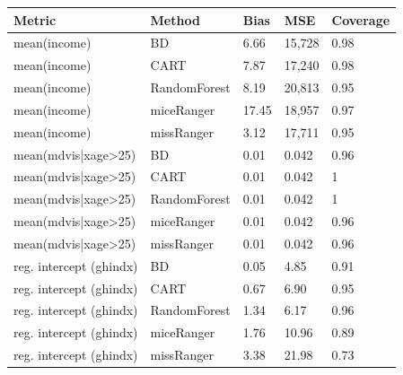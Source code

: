 \documentclass[20pt,margin=1in,innermargin=-4.5in,blockverticalspace=-0.25in]{tikzposter}
\begin{document}
\begin{columns}
{        \begin{center}
        \vspace{-0.5em}
        \begin{tabular}{|l|l|lll|}
             \hline   
             Metric &  Method & Bias \hspace{10mm} & MSE \hspace{5mm} & Coverage\\
             \hline
             mean(income) & BD & 6.66  & 15,728 & 0.98\\
             mean(income) & CART & 7.87 & 17,240 & 0.98\\
             mean(income) & RandomForest & 8.19 & 20,813 & 0.95\\
             mean(income) & miceRanger & 17.45 & 18,957 & 0.97\\
             mean(income) & missRanger  & 3.12 & 17,711 & 0.95 \\
             \hline
             mean(mdvis|xage>25) & BD & 0.01 & 0.042 & 0.96\\
             mean(mdvis|xage>25) & CART & 0.01 & 0.042 & 1\\
             mean(mdvis|xage>25) & RandomForest & 0.01 & 0.042 & 1\\
             mean(mdvis|xage>25) & miceRanger & 0.01 & 0.042 & 0.96\\
             mean(mdvis|xage>25) & missRanger  & 0.01 & 0.042 & 0.96\\
             \hline
             reg. intercept (ghindx) & BD & 0.05 & 4.85 & 0.91\\
             reg. intercept (ghindx) & CART & 0.67 & 6.90 & 0.95\\
             reg. intercept (ghindx) & RandomForest & 1.34 & 6.17 & 0.96\\
             reg. intercept (ghindx) & miceRanger & 1.76 & 10.96 & 0.89\\
             reg. intercept (ghindx) & missRanger  & 3.38 & 21.98 & 0.73\\
             \hline
        \end{tabular}
        \end{center}
    }




        \block{}{
        \vspace{-2.5em}
        
}
\end{columns}
\end{document}
